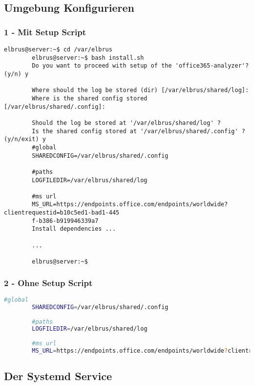 	\subsection[file config]{Umgebung Konfigurieren}
	\subsubsection{1 - Mit Setup Script}
	
	\lstset{style=commands}
	\begin{lstlisting}[caption={Ausführen des 'install.sh' Scripts.}]
		elbrus@server:~$ cd /var/elbrus
		elbrus@server:~$ bash install.sh
		Do you want to proceed with setup of the 'office365-analyzer'? (y/n) y
		
		Where should the log be stored (dir) [/var/elbrus/shared/log]:
		Where is the shared config stored [/var/elbrus/shared/.config]:
		
		Should the log be stored at '/var/elbrus/shared/log' ?
		Is the shared config stored at '/var/elbrus/shared/.config' ? (y/n/exit) y
		#global
		SHAREDCONFIG=/var/elbrus/shared/.config
		
		#paths
		LOGFILEDIR=/var/elbrus/shared/log
		
		#ms url
		MS_URL=https://endpoints.office.com/endpoints/worldwide?clientrequestid=b10c5ed1-bad1-445
		f-b386-b919946339a7
		Install dependencies ...
		
		...
		
		elbrus@server:~$	
	\end{lstlisting}
	
	\subsubsection{2 - Ohne Setup Script}
	
	\lstset{style=files}
	\begin{lstlisting}[caption={Anhand von '.env.example' eigene '.env' Datei anlegen.}, language=bash]
		#global
		SHAREDCONFIG=/var/elbrus/shared/.config
		
		#paths
		LOGFILEDIR=/var/elbrus/shared/log
		
		#ms url
		MS_URL=https://endpoints.office.com/endpoints/worldwide?clientrequestid=b10c5ed1-bad1-445f-b386-b919946339a7
	\end{lstlisting}
	\newpage

	\subsection[systemd service]{Der Systemd Service}
	
